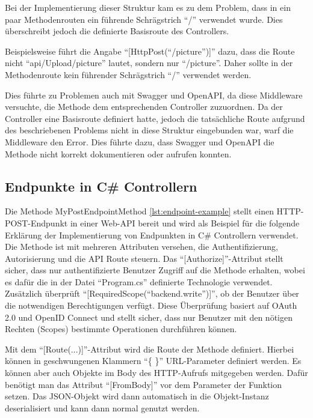 Bei der Implementierung dieser Struktur kam es zu dem Problem, dass in ein paar Methodenrouten
ein führende Schrägstrich ``\slash'' verwendet wurde. Dies überschreibt jedoch die definierte
Basisroute des Controllers.

Beispielsweise führt die Angabe ``[HttpPost(``/picture'')]'' dazu, dass die Route nicht 
``api/Upload/picture'' lautet, sondern nur ``/picture''. Daher sollte in der Methodenroute 
kein führender Schrägstrich ``\slash'' verwendet werden.

Dies führte zu Problemen auch mit Swagger und OpenAPI, da diese Middleware versuchte, 
die Methode dem entsprechenden Controller zuzuordnen. Da der Controller eine Basisroute 
definiert hatte, jedoch die tatsächliche Route aufgrund des beschriebenen Problems nicht 
in diese Struktur eingebunden war, warf die Middleware den Error. Dies führte dazu, 
dass Swagger und OpenAPI die Methode nicht korrekt dokumentieren oder aufrufen konnten.

\subsection{Endpunkte in C\# Controllern}

Die Methode MyPostEndpointMethod \ref{lst:endpoint-example} stellt einen HTTP-POST-Endpunkt in einer Web-API bereit und
wird als Beispiel für die folgende Erklärung der Implementierung von Endpunkten in C\# Controllern
verwendet. Die Methode ist mit mehreren Attributen versehen, die Authentifizierung, 
Autorisierung und die API Route steuern. Das ``[Authorize]''-Attribut stellt sicher, 
dass nur authentifizierte Benutzer Zugriff auf die Methode erhalten, wobei es dafür
die in der Datei ``Program.cs'' definierte Technologie verwendet. Zusätzlich überprüft 
``[RequiredScope(``backend.write'')]'', ob der Benutzer über die notwendigen Berechtigungen 
verfügt. Diese Überprüfung basiert auf OAuth 2.0 und OpenID Connect und stellt sicher, 
dass nur Benutzer mit den nötigen Rechten (Scopes) bestimmte Operationen durchführen können. 

Mit dem ``[Route(...)]''-Attribut wird die Route der Methode definiert. Hierbei können in
geschwungenen Klammern ``\{ \}'' URL-Parameter definiert werden. Es können aber auch 
Objekte im Body des HTTP-Aufrufs mitgegeben werden. Dafür benötigt man das 
Attribut ``[FromBody]'' vor dem Parameter der Funktion setzen. Das JSON-Objekt wird dann
automatisch in die Objekt-Instanz deserialisiert und kann dann normal genutzt werden. 

